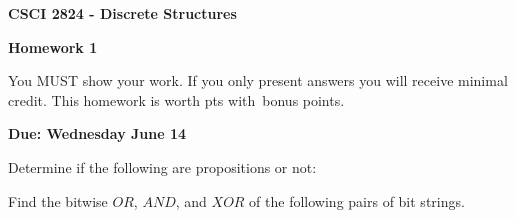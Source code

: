\documentclass[addpoints]{exam}
\begin{document}
\singlespacing

\begin{center}
  {\large\textbf{CSCI 2824 - Discrete Structures}}

  {\large\textbf{Homework 1}}
\end{center}

You MUST show your work. If you only present answers you will receive minimal
credit. This homework is worth \numpoints pts with \numbonuspoints \,bonus
points.

\textbf{Due: Wednesday June 14}


\begin{questions}
  \question[4] Determine if the following are propositions or not:

  \question[9] Find the bitwise $OR$, $AND$, and $XOR$ of the following pairs
  of bit strings.
 \begin{parts}

\end{parts}
\end{questions}
\end{document}
